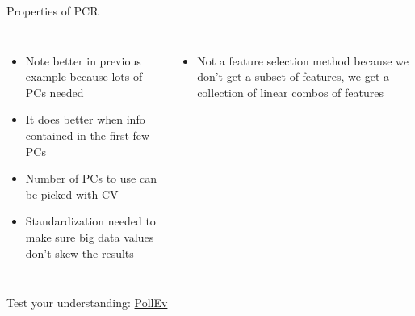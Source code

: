 \documentclass[aspectratio=169,usenames,dvipsnames]{beamer}
\newcommand{\InstructorList}[1]{
\begin{itemize}
	\color{orange}
	#1
\end{itemize}
}
\begin{document}
\begin{frame}[c]{Properties of PCR}

	\begin{columns}
	\centering
	\InstructorList{
	\item Note better in previous example because lots of PCs needed
	\item It does better when info contained in the first few PCs
	\item Number of PCs to use can be picked with CV
	\item Standardization needed to make sure big data values don't skew the results
	}
	\centering
	\InstructorList{
	\item Not a feature selection method because we don't get a subset of features, we get a collection of linear combos of features
	}
	\end{columns}
	
	\vfill
	Test your understanding: \href{https://PollEv.com/multiple_choice_polls/2VGAXRSk8kmwbgBeDBAxX/respond}{PollEv}
	\end{frame}




\end{document}
